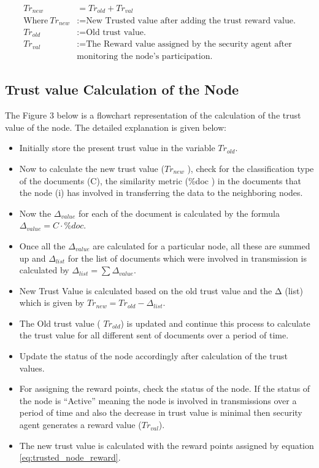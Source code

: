 \begin{equation}
    \label{eq:trusted_node_reward}
    \begin{aligned}
    Tr_{new} &= Tr_{old} + Tr_{val} \\
    \text{Where}~Tr_{new} &:= \text{New Trusted value after adding the trust reward value.} \\
    Tr_{old} &:= \text{Old trust value.} \\
    Tr_{val} &:= \text{The Reward value assigned by the security agent after}\\
                 &\text{monitoring the node's participation.}
\end{aligned}
\end{equation}
 \subsection{Trust value Calculation of the Node}
The Figure 3 below is a flowchart representation of the calculation of the trust value of the node. The detailed explanation is given below:
\begin{itemize}
    \item Initially store the present trust value in the variable \( Tr_{old} \).
    \item Now to calculate the new trust value (\( Tr_{new} \) ), check for the
    classification type of the documents (C), the similarity metric (\%doc ) in
    the documents that the node (i) has involved in transferring the data to the
    neighboring nodes.  
    \item Now the \( \Delta_{value} \) for each of the document is calculated
    by the formula  \( \Delta_{value} = C \cdot \% doc \).
    \item Once all the \( \Delta_{value} \) are calculated for a particular node, all these are
    summed up and      \( \Delta_{list} \) for the list of documents which were involved in
    transmission is calculated by \( \Delta_{list} = \sum \Delta_{value} \).  
    \item New Trust Value is calculated based on the old trust value and the Δ (list)
        which is given by \( Tr_{new} = Tr_{old} - \Delta_{list} \).
    \item The Old trust value ( \(Tr_{old} \)) is updated and continue this process to
    calculate the trust value for all different sent of documents over a period
    of time.  
    \item Update the status of the node accordingly after calculation of the
    trust values.
    \item For assigning the reward points, check the status of the node. If the status
    of the node is “Active” meaning the node is involved in transmissions over
    a period of time and also the decrease in trust value is minimal then
    security agent generates a reward value      (\( Tr_{val} \)).  
    \item The new trust value is calculated with the reward points assigned by
        equation \ref{eq:trusted_node_reward}.
\end{itemize}

